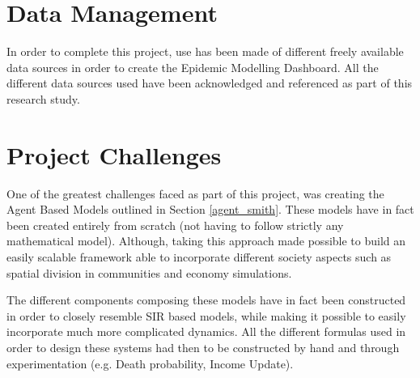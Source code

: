 \section{Data Management}
In order to complete this project, use has been made of different freely available data sources in order to create the Epidemic Modelling Dashboard. All the different data sources used have been acknowledged and referenced as part of this research study. 

\section{Project Challenges}
One of the greatest challenges faced as part of this project, was creating the Agent Based Models outlined in Section \ref{agent_smith}. These models have in fact been created entirely from scratch (not having to follow strictly any mathematical model). Although, taking this approach made possible to build an easily scalable framework able to incorporate different society aspects such as spatial division in communities and economy simulations. 

The different components composing these models have in fact been constructed in order to closely resemble SIR based models, while making it possible to easily incorporate much more complicated dynamics. All the different formulas used in order to design these systems had then to be constructed by hand and through experimentation (e.g. Death probability, Income Update).